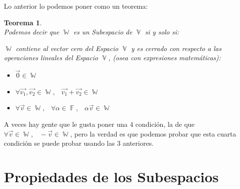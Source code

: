 \documentclass[12pt, fleqn]{report}                             %
\newcommand \ForceNewLine       {$\Space$\\}                    %
\DeclareMathOperator \Space     {\quad}                         %
\DeclareMathOperator \MiniSpace {\;}                            %
\newtheorem{Theorem}        {Teorema}[section]                  %
\theoremstyle{break}                                            %
\DeclareMathOperator \GenericField {\mathbb{F}}                 %
\DeclareMathOperator \VectorSet    {\mathbb{V}}                 %
\DeclareMathOperator \SubVectorSet {\mathbb{W}}                 %
\begin{document}
            Lo anterior lo podemos poner como un teorema:

            \begin{Theorem}
                \ForceNewLine
                Podemos decir que $\SubVectorSet$ es un Subespacio de $\VectorSet$
                si y solo si:

                $\SubVectorSet$ contiene al vector cero del Espacio $\VectorSet$ y es cerrado
                con respecto a las operaciones lineales del Espacio $\VectorSet$, (osea con
                expresiones matemáticas):

                \begin{itemize}
                    \item $\vec{0} \in \SubVectorSet$
                    
                    \item $\forall \vec{v_1}, \vec{v_2} \in \SubVectorSet, \MiniSpace
                                \vec{v_1} + \vec{v_2} \in \SubVectorSet$

                    \item $\forall \vec{v} \in \SubVectorSet, \MiniSpace
                                \forall \alpha \in \GenericField, \MiniSpace
                                    \alpha \vec{v} \in \SubVectorSet$
                \end{itemize}

            \end{Theorem}

            A veces hay gente que le gusta poner una 4 condición, la de que
            $\forall \vec{v} \in \SubVectorSet, \MiniSpace -\vec{v} \in \SubVectorSet$,
            pero la verdad es que podemos probar que esta cuarta condición se puede probar
            usando las 3 anteriores.



        \clearpage
        \section{Propiedades de los Subespacios}
\end{document}
